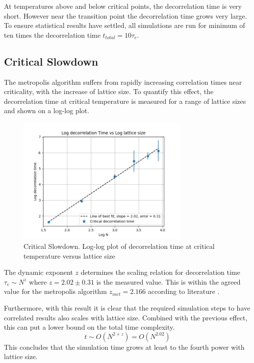 \documentclass[a4paper, 12pt]{article}
\begin{document}
At temperatures above and below critical points, the decorrelation time is very short. However near the transition point the decorrelation time grows very large. To ensure statistical results have settled, all simulations are run for minimum of ten times the decorrelation time \(t_{total} = 10\tau_e \).

	\subsection{Critical Slowdown}
The metropolis algorithm suffers from rapidly increasing correlation times near criticality, with the increase of lattice size. To quantify this effect, the decorrelation time at critical temperature is measured for a range of lattice sizes and shown on a log-log plot.

\begin{figure}[H]
\centering
\includegraphics[width=0.75\textwidth]{./resources/critical_slowdown.png}
\caption{Critical Slowdown. Log-log plot of decorrelation time at critical temperature versus lattice size}
\end{figure}

The dynamic exponent \(z\) determines the scaling relation for decorrelation time \(\tau_e \sim N^z \) where \( z = 2.02 \pm 0.31 \) is the measured value. This is within the agreed value for the metropolis algorithm \(z_{met} = 2.166 \) according to literature \cite{3}.

Furthermore, with this result it is clear that the required simulation steps to have correlated results also scales with lattice size. Combined with the previous effect, this can put a lower bound on the total time complexity.
\[ t \sim O(N^{2+z}) = O(N^{2.02}) \]
This concludes that the simulation time grows at least to the fourth power with lattice size.
\end{document}
